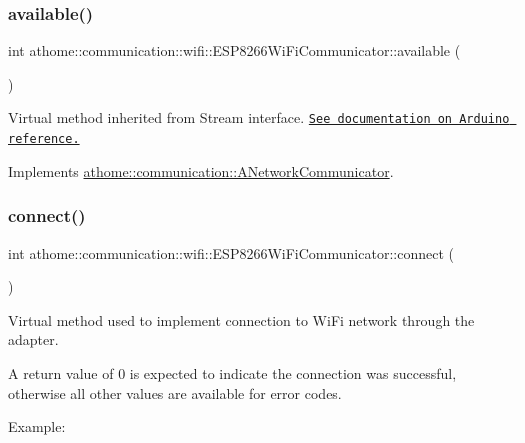 \subsubsection{\texorpdfstring{available()}{available()}}
{\footnotesize\ttfamily int athome\+::communication\+::wifi\+::\+E\+S\+P8266\+Wi\+Fi\+Communicator\+::available (\begin{DoxyParamCaption}{ }\end{DoxyParamCaption})\hspace{0.3cm}{\ttfamily [virtual]}}

Virtual method inherited from Stream interface. \href{https://www.arduino.cc/reference/en/language/functions/communication/stream/streamavailable/}{\tt See documentation on Arduino reference.} 

Implements \mbox{\hyperlink{classathome_1_1communication_1_1_a_network_communicator_a2bf367d03c98e8523fda71dd43ffa2fb}{athome\+::communication\+::\+A\+Network\+Communicator}}.

\mbox{\label{classathome_1_1communication_1_1wifi_1_1_e_s_p8266_wi_fi_communicator_a58cc439be2f368b346bbbe1601a9b675}} 
\subsubsection{\texorpdfstring{connect()}{connect()}}
{\footnotesize\ttfamily int athome\+::communication\+::wifi\+::\+E\+S\+P8266\+Wi\+Fi\+Communicator\+::connect (\begin{DoxyParamCaption}{ }\end{DoxyParamCaption})\hspace{0.3cm}{\ttfamily [virtual]}}

Virtual method used to implement connection to Wi\+Fi network through the adapter.

A return value of 0 is expected to indicate the connection was successful, otherwise all other values are available for error codes.

Example\+:


